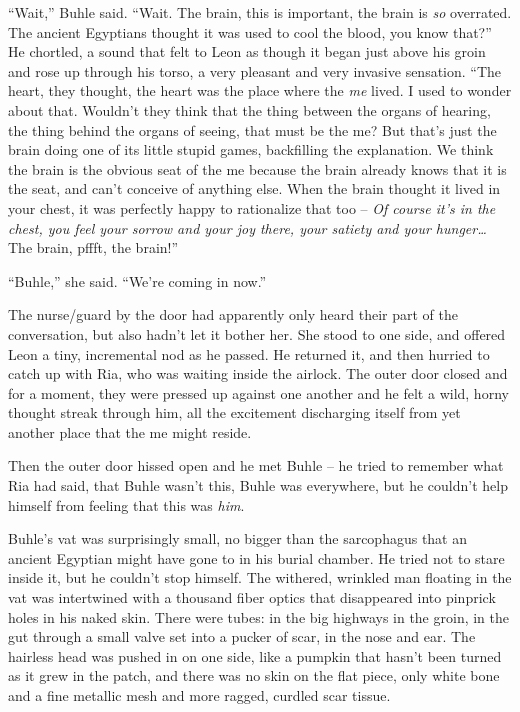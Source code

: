 “Wait,” Buhle said. “Wait. The brain, this is important, the 
brain is \emph{so} overrated. The ancient Egyptians thought it was used 
to cool the blood, you know that?” He chortled, a sound that felt to 
Leon as though it began just above his groin and rose up through his 
torso, a very pleasant and very invasive sensation. “The heart, they 
thought, the heart was the place where the \emph{me} lived. I used to 
wonder about that. Wouldn't they think that the thing between the 
organs of hearing, the thing behind the organs of seeing, that must be 
the me? But that's just the brain doing one of its little stupid games, 
backfilling the explanation. We think the brain is the obvious seat of 
the me because the brain already knows that it is the seat, and can't 
conceive of anything else. When the brain thought it lived in your 
chest, it was perfectly happy to rationalize that too -- \emph{Of 
course it's in the chest, you feel your sorrow and your joy there, your 
satiety and your hunger\ldots{}} The brain, pffft, the brain!”

“Buhle,” she said. “We're coming in now.”

The nurse/guard by the door had apparently only heard their part of the 
conversation, but also hadn't let it bother her. She stood to one side, 
and offered Leon a tiny, incremental nod as he passed. He returned it, 
and then hurried to catch up with Ria, who was waiting inside the 
airlock. The outer door closed and for a moment, they were pressed up 
against one another and he felt a wild, horny thought streak through 
him, all the excitement discharging itself from yet another place that 
the me might reside.

Then the outer door hissed open and he met Buhle -- he tried to 
remember what Ria had said, that Buhle wasn't this, Buhle was 
everywhere, but he couldn't help himself from feeling that this was 
\emph{him}.

Buhle's vat was surprisingly small, no bigger than the sarcophagus that 
an ancient Egyptian might have gone to in his burial chamber. He tried 
not to stare inside it, but he couldn't stop himself. The withered, 
wrinkled man floating in the vat was intertwined with a thousand fiber 
optics that disappeared into pinprick holes in his naked skin. There 
were tubes: in the big highways in the groin, in the gut through a 
small valve set into a pucker of scar, in the nose and ear. The 
hairless head was pushed in on one side, like a pumpkin that hasn't 
been turned as it grew in the patch, and there was no skin on the flat 
piece, only white bone and a fine metallic mesh and more ragged, 
curdled scar tissue.

